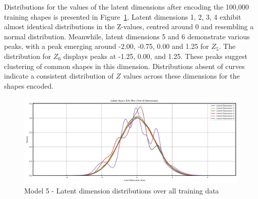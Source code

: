 \documentclass{article}
\begin{document}
Distributions for the values of the latent dimensions after encoding the 100,000 training shapes is presented in Figure~\ref{fig:model5_latent_dist}. Latent dimensions 1, 2, 3, 4 exhibit almost identical distributions in the Z-values, centred around 0 and resembling a normal distribution. Meanwhile, latent dimensions 5 and 6 demonstrate various peaks, with a peak emerging around -2.00, -0.75, 0.00 and 1.25 for $Z_5$. The distribution for $Z_6$ displays peaks at -1.25, 0.00, and 1.25. These peaks suggest clustering of common shapes in this dimension. Distributions absent of curves indicate a consistent distribution of $Z$ values across these dimensions for the shapes encoded.

\begin{figure}[H]
    \centering
    \includegraphics[width=0.75\linewidth]{figures/VAEmodels/model5/latent_distribution.png}
    \caption{Model 5 - Latent dimension distributions over all training data}
    \label{fig:model5_latent_dist}
\end{figure}
\end{document}
